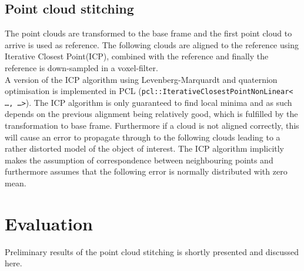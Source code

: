 \subsection{Point cloud stitching}

The point clouds are transformed to the base frame and the first point cloud to arrive is used as reference. The following clouds are aligned to the reference using Iterative Closest Point(ICP), combined with the reference and finally the reference is down-sampled in a voxel-filter.\\ 

A version of the ICP algorithm using Levenberg-Marquardt and quaternion optimisation\cite{Rusinkiewicz} is implemented in PCL (\texttt{pcl::IterativeClosestPointNonLinear< \ldots , \ldots >}). The ICP algorithm is only guaranteed to find local minima and as such depends on the previous alignment being relatively good, which is fulfilled by the transformation to base frame. Furthermore if a cloud is not aligned correctly, this will cause an error to propagate through to the following clouds leading to a rather distorted model of the object of interest\cite{choe2007registration}. The ICP algorithm implicitly makes the assumption of correspondence between neighbouring points and furthermore assumes that the following error is normally distributed with zero mean.

\section{Evaluation}
Preliminary results of the point cloud stitching is shortly presented and discussed here. 

